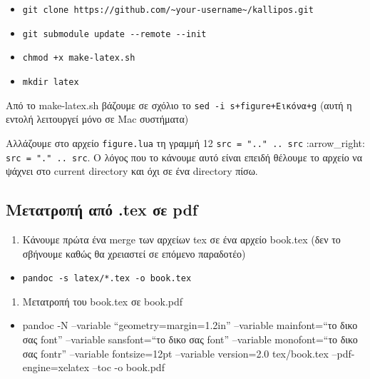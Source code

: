 \begin{itemize}
\item
  \texttt{git\ clone\ https://github.com/\textasciitilde{}your-username\textasciitilde{}/kallipos.git}
\item
  \texttt{git\ submodule\ update\ -\/-remote\ -\/-init}
\item
  \texttt{chmod\ +x\ make-latex.sh}
\item
  \texttt{mkdir\ latex}
\end{itemize}

Από το make-latex.sh βάζουμε σε σχόλιο το
\texttt{sed\ -i\ s+figure+Εικόνα+g} (αυτή η εντολή λειτουργεί μόνο σε
Mac συστήματα)

Αλλάζουμε στο αρχείο \texttt{figure.lua} τη γραμμή 12
\texttt{src\ =\ ".."\ ..\ src} :arrow\_right:
\texttt{src\ =\ "."\ ..\ src}. Ο λόγος που το κάνουμε αυτό είναι επειδή
θέλουμε το αρχείο να ψάχνει στο current directory και όχι σε ένα
directory πίσω.

\hypertarget{ux3bcux3b5ux3c4ux3b1ux3c4ux3c1ux3bfux3c0ux3ae-ux3b1ux3c0ux3cc-.tex-ux3c3ux3b5-pdf}{%
\subsection{Μετατροπή από .tex σε
pdf}\label{ux3bcux3b5ux3c4ux3b1ux3c4ux3c1ux3bfux3c0ux3ae-ux3b1ux3c0ux3cc-.tex-ux3c3ux3b5-pdf}}

\begin{enumerate}
\def\labelenumi{\arabic{enumi}.}
\tightlist
\item
  Κάνουμε πρώτα ένα merge των αρχείων tex σε ένα αρχείο book.tex (δεν το
  σβήνουμε καθώς θα χρειαστεί σε επόμενο παραδοτέο)
\end{enumerate}

\begin{itemize}
\tightlist
\item
  \texttt{pandoc\ -s\ latex/*.tex\ -o\ book.tex}
\end{itemize}

\begin{enumerate}
\def\labelenumi{\arabic{enumi}.}
\setcounter{enumi}{1}
\tightlist
\item
  Μετατροπή του book.tex σε book.pdf
\end{enumerate}

\begin{itemize}
\tightlist
\item
  pandoc -N --variable ``geometry=margin=1.2in'' --variable
  mainfont=``το δικο σας font'' --variable sansfont=``το δικο σας font''
  --variable monofont=``το δικο σας fontr'' --variable fontsize=12pt
  --variable version=2.0 tex/book.tex --pdf-engine=xelatex --toc -o
  book.pdf
\end{itemize}

